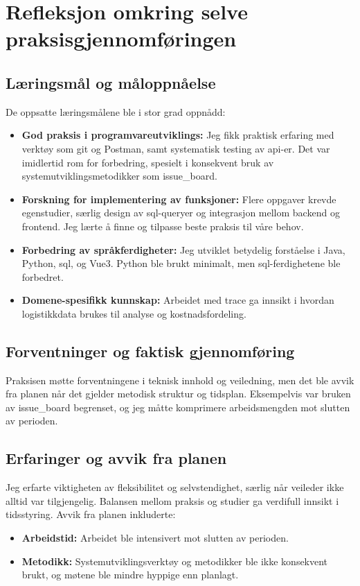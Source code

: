 \section{Refleksjon omkring selve praksisgjennomføringen}

\subsection{Læringsmål og måloppnåelse}
De oppsatte læringsmålene ble i stor grad oppnådd:
\begin{itemize} 
    \item \textbf{God praksis i programvareutviklings:} Jeg fikk praktisk erfaring med verktøy som \Gls{git} og Postman, samt systematisk testing av \gls{api}-er. Det var imidlertid rom for forbedring, spesielt i konsekvent bruk av systemutviklingsmetodikker som \gls{issue_board}. 
    \item \textbf{Forskning for implementering av funksjoner:} Flere oppgaver krevde egenstudier, særlig design av \gls{sql}-queryer og integrasjon mellom backend og frontend. Jeg lærte å finne og tilpasse beste praksis til våre behov. 
    \item \textbf{Forbedring av språkferdigheter:} Jeg utviklet betydelig forståelse i Java, Python, \gls{sql}, og Vue3. Python ble brukt minimalt, men \gls{sql}-ferdighetene ble forbedret. 
    \item \textbf{Domene-spesifikk kunnskap:} Arbeidet med \gls{trace} ga innsikt i hvordan logistikkdata brukes til analyse og kostnadsfordeling. 
\end{itemize}

\subsection{Forventninger og faktisk gjennomføring}
Praksisen møtte forventningene i teknisk innhold og veiledning, men det ble avvik fra planen når det gjelder metodisk struktur og tidsplan. Eksempelvis var bruken av \gls{issue_board} begrenset, og jeg måtte komprimere arbeidsmengden mot slutten av perioden.

\subsection{Erfaringer og avvik fra planen}
Jeg erfarte viktigheten av fleksibilitet og selvstendighet, særlig når veileder ikke alltid var tilgjengelig. Balansen mellom praksis og studier ga verdifull innsikt i tidsstyring.
Avvik fra planen inkluderte:
\begin{itemize} 
    \item \textbf{Arbeidstid:} Arbeidet ble intensivert mot slutten av perioden. 
    \item \textbf{Metodikk:} Systemutviklingsverktøy og metodikker ble ikke konsekvent brukt, og møtene ble mindre hyppige enn planlagt. 
\end{itemize}

